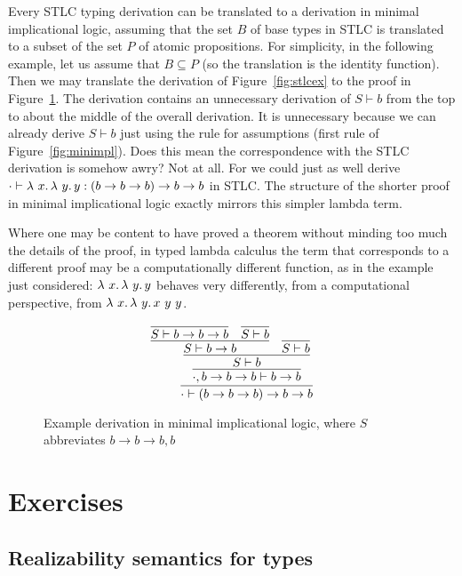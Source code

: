 Every STLC typing derivation can be translated to a derivation in
minimal implicational logic, assuming that the set $B$ of base types
in STLC is translated to a subset of the set $P$ of atomic
propositions.  For simplicity, in the following example, let us assume
that $B \subseteq P$ (so the translation is the identity function).
Then we may translate the derivation of Figure~\ref{fig:stlcex} to the
proof in Figure~\ref{fig:minimplex}.  The derivation contains an
unnecessary derivation of $S \vdash b$ from the top to about the
middle of the overall derivation.  It is unnecessary because we can
already derive $S \vdash b$ just using the rule for assumptions (first
rule of Figure~\ref{fig:minimpl}).  Does this mean the correspondence
with the STLC derivation is somehow awry?  Not at all.  For we could
just as well derive $\cdot \vdash \lambda\ x.\, \lambda\ y.\, y : (b \to b \to
b) \to b \to b$ in STLC.  The structure of the shorter proof in
minimal implicational logic exactly mirrors this simpler lambda term.

Where one may be content to have proved a theorem without minding
too much the details of the proof, in typed lambda calculus the term
that corresponds to a different proof may be a computationally different
function, as in the example just considered: $\lambda\ x.\, \lambda\ y.\, y$
behaves very differently, from a computational perspective, from
$\lambda\ x.\, \lambda\ y.\, x\ y\ y$.

\begin{figure}
  \[
  \infer{\cdot \vdash  (b \to b \to b) \to b \to b}
        {\infer{\cdot,b \to b \to b \vdash b \to b}
          {\infer{S \vdash b}
            {\infer{S \vdash b \to b}
              {\infer{S \vdash b \to b \to b}{\ }
              & \infer{S \vdash b}{\ }}
            &\infer{S \vdash b}{\ }}}}
  \]
\caption{Example derivation in minimal implicational logic, where $S$ abbreviates $b \to b \to b, b$}
\label{fig:minimplex}
\end{figure}


\section{Exercises}

\subsection{Realizability semantics for types}

